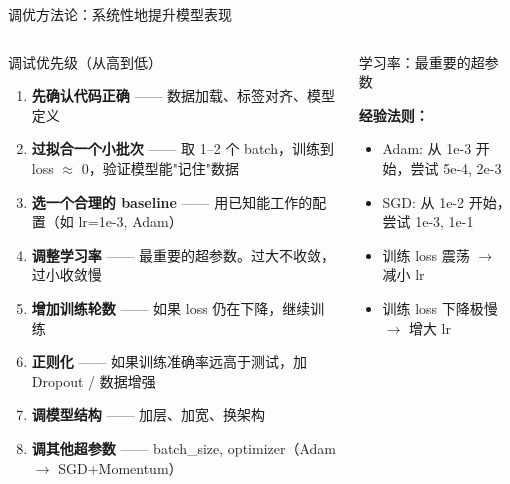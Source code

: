 \documentclass[aspectratio=169]{ctexbeamer}
\begin{document}
\begin{frame}[shrink=20]{调优方法论：系统性地提升模型表现}
\small

\begin{columns}[T]
\begin{block}{调试优先级（从高到低）}
\footnotesize
\begin{enumerate}
  \item \textbf{先确认代码正确} —— 数据加载、标签对齐、模型定义
  \item \textbf{过拟合一个小批次} —— 取 1--2 个 batch，训练到 loss $\approx$ 0，验证模型能"记住"数据
  \item \textbf{选一个合理的 baseline} —— 用已知能工作的配置（如 lr=1e-3, Adam）
  \item \textbf{调整学习率} —— 最重要的超参数。过大不收敛，过小收敛慢
  \item \textbf{增加训练轮数} —— 如果 loss 仍在下降，继续训练
  \item \textbf{正则化} —— 如果训练准确率远高于测试，加 Dropout / 数据增强
  \item \textbf{调模型结构} —— 加层、加宽、换架构
  \item \textbf{调其他超参数} —— batch\_size, optimizer（Adam $\to$ SGD+Momentum）
\end{enumerate}
\end{block}

\begin{block}{学习率：最重要的超参数}
\footnotesize
\begin{center}
\end{center}

\textbf{经验法则：}
\begin{itemize}
  \item Adam: 从 1e-3 开始，尝试 5e-4, 2e-3
  \item SGD: 从 1e-2 开始，尝试 1e-3, 1e-1
  \item 训练 loss 震荡 $\to$ 减小 lr
  \item 训练 loss 下降极慢 $\to$ 增大 lr
\end{itemize}
\end{block}
\end{columns}


\end{frame}
\end{document}
